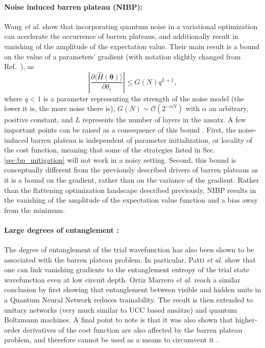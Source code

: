\paragraph{Noise induced barren plateau (NIBP):} Wang \textit{et al.} \cite{Wang2020} show that incorporating quantum noise in a variational optimization can accelerate the occurrence of barren plateaus, and additionally result in vanishing of the amplitude of the expectation value. Their main result is a bound on the value of a parameters' gradient (with notation slightly changed from Ref.~\cite{Wang2020}), as
\begin{equation}
    \left| \frac{\partial \langle \hat{H}(\boldsymbol{\theta}) \rangle}{\partial \theta_i}  \right| \leq G(N)q^{L+1},
\end{equation}
where $q < 1$ is a parameter representing the strength of the noise model (the lower it is, the more noise there is), $G(N) \sim \mathcal{O}(2^{-\alpha N})$ with $\alpha$ an arbitrary, positive constant, and $L$ represents the number of layers in the ansatz. A few important points can be raised as a consequence of this bound \cite{Wang2020}. First, the noise-induced barren plateau is independent of parameter initialization, or locality of the cost function, meaning that some of the strategies listed in Sec. \ref{sec:bp_mitigation} will not work in a noisy setting. Second, this bound is conceptually different from the previously described drivers of barren plateaus as it is a bound on the gradient, rather than on the variance of the gradient. Rather than the flattening optimization landscape described previously, NIBP results in the vanishing of the amplitude of the expectation value function and a bias away from the minimum. 

\paragraph{Large degrees of entanglement \cite{OrtizMarrero2020, Patti2021}:} The degree of entanglement of the trial wavefunction has also been shown to be associated with the barren plateau problem. In particular, Patti \textit{et al.} show that one can link vanishing gradients to the entanglement entropy \cite{nielsenQuantumComputationQuantum2010} of the trial state wavefunction even at low circuit depth. Ortiz Marrero \textit{et al.} reach a similar conclusion by first showing that entanglement between visible and hidden units in a Quantum Neural Network reduces trainability. The result is then extended to unitary networks (very much similar to UCC based ans\"atze) and quantum Boltzmann machines. 
A final point to note is that it was also shown that higher-order derivatives of the cost function are also affected by the barren plateau problem, and therefore cannot be used as a means to circumvent it \cite{Cerezo2021_BP_higher_order}.

